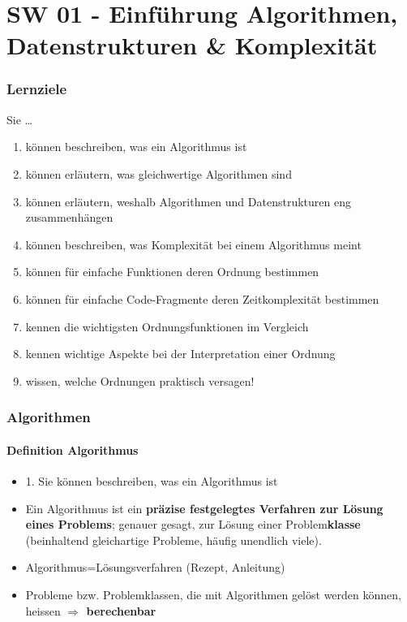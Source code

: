 \part{SW 01 - Einführung Algorithmen, Datenstrukturen \& Komplexität}
\section{Lernziele}
Sie \dots
\begin{enumerate}
    \item können beschreiben, was ein Algorithmus ist
    \item können erläutern, was gleichwertige Algorithmen sind
    \item können erläutern, weshalb Algorithmen und Datenstrukturen eng zusammenhängen
    \item können beschreiben, was Komplexität bei einem Algorithmus meint
    \item können für einfache Funktionen deren Ordnung bestimmen
    \item können für einfache Code-Fragmente deren Zeitkomplexität bestimmen
    \item kennen die wichtigsten Ordnungsfunktionen im Vergleich
    \item kennen wichtige Aspekte bei der Interpretation einer Ordnung
    \item wissen, welche Ordnungen praktisch versagen!
\end{enumerate}

\section{Algorithmen}
\subsection{Definition Algorithmus}
\begin{itemize}
    \item[]{\color{red}1. Sie können beschreiben, was ein Algorithmus ist}
    \item Ein Algorithmus ist ein \textbf{präzise festgelegtes Verfahren zur Lösung eines Problems}; genauer gesagt, zur Lösung einer Problem\textbf{klasse} (beinhaltend gleichartige Probleme, häufig unendlich viele).
    \item Algorithmus=Lösungsverfahren (Rezept, Anleitung)
    \item Probleme bzw. Problemklassen, die mit Algorithmen gelöst werden können, heissen \textbf{$\Rightarrow$ berechenbar}
\end{itemize}


